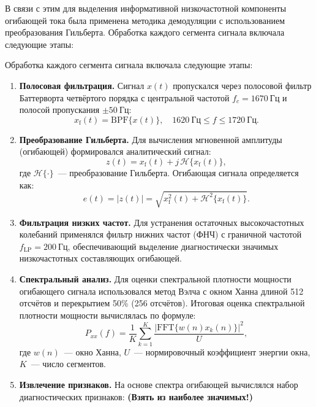 В связи с этим для выделения информативной низкочастотной компоненты огибающей тока была применена методика демодуляции с использованием преобразования Гильберта. Обработка каждого сегмента сигнала включала следующие этапы:

Обработка каждого сегмента сигнала включала следующие этапы:

\begin{enumerate}
    \item \textbf{Полосовая фильтрация.}  
    Сигнал \( x(t) \) пропускался через полосовой фильтр Баттерворта четвёртого порядка с центральной частотой \( f_c = 1670~\text{Гц} \) и полосой пропускания \( \pm 50~\text{Гц} \):
    \[
        x_{\mathrm{f}}(t) = \mathrm{BPF}\{x(t)\}, \quad 1620~\text{Гц} \le f \le 1720~\text{Гц}.
    \]

    \item \textbf{Преобразование Гильберта.}  
    Для вычисления мгновенной амплитуды (огибающей) формировался аналитический сигнал:
    \[
        z(t) = x_{\mathrm{f}}(t) + j\,\mathcal{H}\{x_{\mathrm{f}}(t)\},
    \]
    где \( \mathcal{H}\{\cdot\} \)~— преобразование Гильберта.  
    Огибающая сигнала определяется как:
    \[
        e(t) = |z(t)| = \sqrt{x_{\mathrm{f}}^2(t) + \mathcal{H}^2\{x_{\mathrm{f}}(t)\}}.
    \]

    \item \textbf{Фильтрация низких частот.}  
    Для устранения остаточных высокочастотных колебаний применялся фильтр нижних частот (ФНЧ) с граничной частотой \( f_{\text{LP}} = 200~\text{Гц} \), обеспечивающий выделение диагностически значимых низкочастотных составляющих огибающей.

    \item \textbf{Спектральный анализ.}  
    Для оценки спектральной плотности мощности огибающего сигнала использовался метод Вэлча с окном Ханна длиной 512 отсчётов и перекрытием 50\% (256 отсчётов).  
    Итоговая оценка спектральной плотности мощности вычислялась по формуле:
    \[
        P_{xx}(f) = \frac{1}{K}\sum_{k=1}^{K} \frac{|\mathrm{FFT}\{w(n)x_k(n)\}|^2}{U},
    \]
    где \( w(n) \)~— окно Ханна, \( U \)~— нормировочный коэффициент энергии окна, \( K \)~— число сегментов.

    \item \textbf{Извлечение признаков.}  
    На основе спектра огибающей вычислялся набор диагностических признаков: \textbf{(Взять из наиболее значимых!)}
\end{enumerate}
